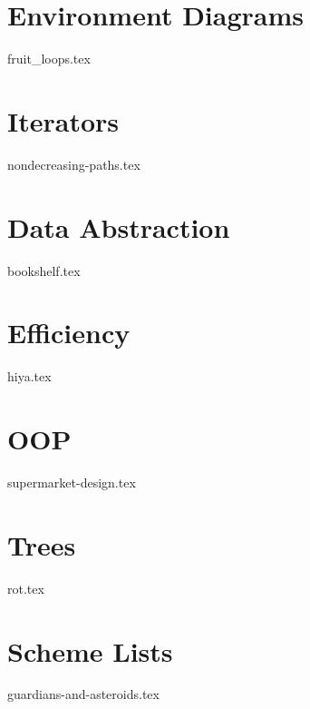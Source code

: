 \documentclass{exam}
\begin{document}
\newpage
\begin{questions}
\section{Environment Diagrams}
{fruit_loops.tex}

\section{Iterators}
{nondecreasing-paths.tex}

\section{Data Abstraction}
{bookshelf.tex}

\section{Efficiency}
{hiya.tex}

\section{OOP}
{supermarket-design.tex}

\section{Trees}
{rot.tex}

\section{Scheme Lists}
{guardians-and-asteroids.tex}
\end{questions}
\end{document}
